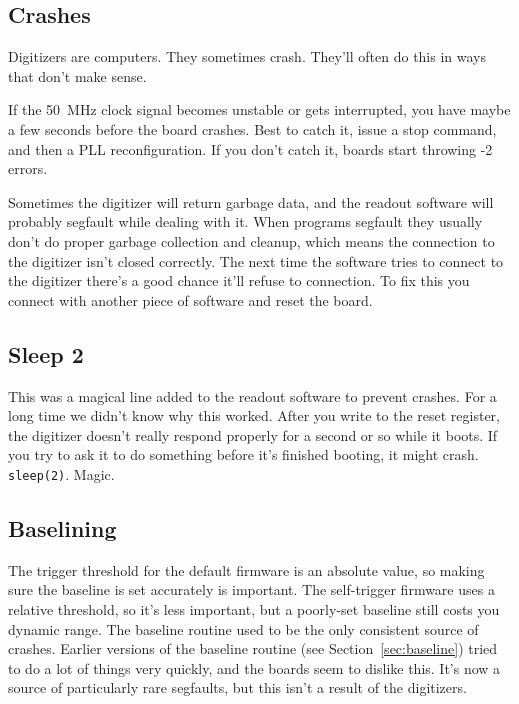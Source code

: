 \subsection{Crashes}

Digitizers are computers.
They sometimes crash.
They'll often do this in ways that don't make sense.

If the \SI{50}{\mega\hertz} clock signal becomes unstable or gets interrupted, you have maybe a few seconds before the board crashes.
Best to catch it, issue a stop command, and then a PLL reconfiguration.
If you don't catch it, boards start throwing -2 errors.

Sometimes the digitizer will return garbage data, and the readout software will probably segfault while dealing with it.
When programs segfault they usually don't do proper garbage collection and cleanup, which means the connection to the digitizer isn't closed correctly.
The next time the software tries to connect to the digitizer there's a good chance it'll refuse to connection.
To fix this you connect with another piece of software and reset the board.

\subsection{Sleep 2}

This was a magical line added to the readout software to prevent crashes.
For a long time we didn't know why this worked.
After you write to the reset register, the digitizer doesn't really respond properly for a second or so while it boots.
If you try to ask it to do something before it's finished booting, it might crash.
\texttt{sleep(2)}.
Magic.

\subsection{Baselining}

The trigger threshold for the default firmware is an absolute value, so making sure the baseline is set accurately is important.
The self-trigger firmware uses a relative threshold, so it's less important, but a poorly-set baseline still costs you dynamic range.
The baseline routine used to be the only consistent source of crashes.
Earlier versions of the baseline routine (see Section~\ref{sec:baseline}) tried to do a lot of things very quickly, and the boards seem to dislike this.
It's now a source of particularly rare segfaults, but this isn't a result of the digitizers.

